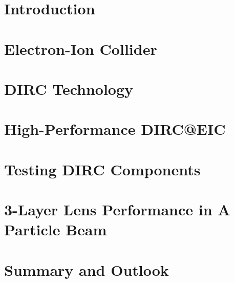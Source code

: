 \documentclass[12pt]{report}
\numberwithin{equation}{chapter}
\begin{document}
\chapter{Introduction}

\chapter{Electron-Ion Collider}

\chapter{DIRC Technology}

\chapter{High-Performance DIRC@EIC}

\chapter{Testing DIRC Components}

\chapter{3-Layer Lens Performance in A Particle Beam}

\chapter{Summary and Outlook}


\end{document}
